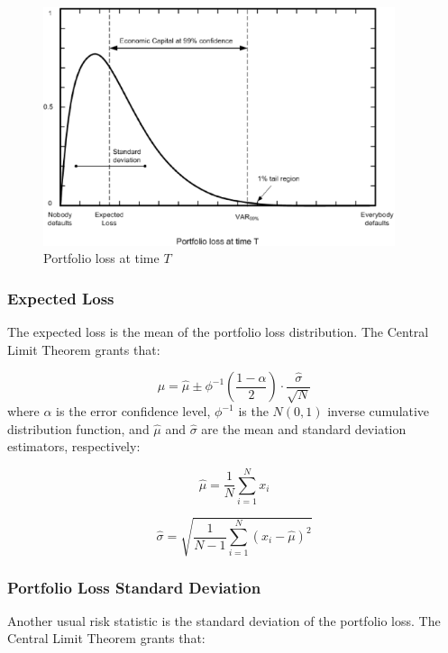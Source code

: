 \documentclass[a4paper,12pt,final]{article}
\begin{document}
\begin{figure}[!hbt]
\begin{center}
\includegraphics[height=7cm, angle=0]{./images/creditvar.eps}
\caption{Portfolio loss at time $T$}
\label{creditvar}
\end{center}
\end{figure}
\FloatBarrier

\subsubsection{Expected Loss}
The expected loss is the mean of the portfolio loss distribution.
The Central Limit Theorem \cite{stats:schaum} grants that:

\begin{displaymath}
\mu = \widehat{\mu} \pm \phi^{-1}\left(\frac{1-\alpha}{2}\right) \cdot \frac{\widehat{\sigma}}{\sqrt{N}}
\end{displaymath}
where $\alpha$ is the error confidence level, $\phi^{-1}$ is the $N(0,1)$ inverse 
cumulative distribution function, and $\widehat{\mu}$ and $\widehat{\sigma}$ are 
the mean and standard deviation estimators, respectively:

\begin{displaymath}
\widehat{\mu} = \frac{1}{N} \sum_{i=1}^{N} x_i
\end{displaymath}

\begin{displaymath}
\widehat{\sigma} =
\sqrt{\frac{1}{N-1} \sum_{i=1}^{N} \left( x_i - \widehat{\mu} \right)^2}
\end{displaymath}

\subsubsection{Portfolio Loss Standard Deviation}
Another usual risk statistic is the standard deviation of the portfolio loss.
The Central Limit Theorem \cite{stats:schaum} grants that:
\end{document}

